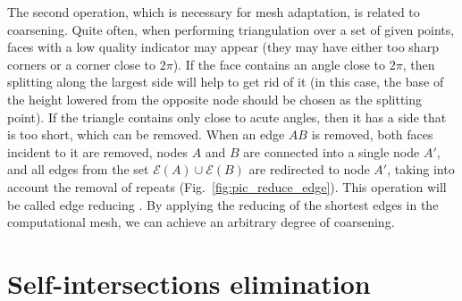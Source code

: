 \documentclass[
11pt,%
tightenlines,%
twoside,%
onecolumn,%
nofloats,%
nobibnotes,%
nofootinbib,%
superscriptaddress,%
noshowpacs,%
centertags]%
{revtex4-2}
\begin{document}
The second operation, which is necessary for mesh adaptation, is related to coarsening.
Quite often, when performing triangulation over a set of given points, faces with a low quality indicator may appear (they may have either too sharp corners or a corner close to $2 \pi$).
If the face contains an angle close to $2 \pi$, then splitting along the largest side will help to get rid of it (in this case, the base of the height lowered from the opposite node should be chosen as the splitting point).
If the triangle contains only close to acute angles, then it has a side that is too short, which can be removed.
When an edge $AB$ is removed, both faces incident to it are removed, nodes $A$ and $B$ are connected into a single node $A'$, and all edges from the set $\mathscr{E}(A) \cup \mathscr{E} (B)$ are redirected to node $A'$, taking into account the removal of repeats (Fig.~\ref{fig:pic_reduce_edge}).
This operation will be called edge reducing \cite{Panchal}.
By applying the reducing of the shortest edges in the computational mesh, we can achieve an arbitrary degree of coarsening.


\section{Self-intersections elimination}
\end{document}
